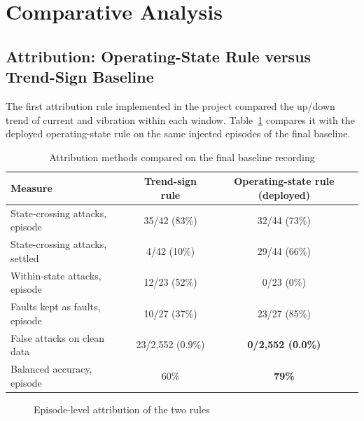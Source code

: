 \section{Comparative Analysis}

\subsection{Attribution: Operating-State Rule versus Trend-Sign Baseline}

The first attribution rule implemented in the project compared the up/down trend of current and vibration within each window. Table~\ref{tab:attribcompare} compares it with the deployed operating-state rule on the same injected episodes of the final baseline.

\begin{table}[htbp]
\centering
\caption{Attribution methods compared on the final baseline recording}
\label{tab:attribcompare}
\small
\begin{tabularx}{\textwidth}{@{}X c c@{}}
\toprule
\textbf{Measure} & \textbf{Trend-sign rule} & \textbf{Operating-state rule (deployed)} \\
\midrule
State-crossing attacks, episode & 35/42 (83\%) & 32/44 (73\%) \\
State-crossing attacks, settled & 4/42 (10\%) & 29/44 (66\%) \\
Within-state attacks, episode & 12/23 (52\%) & 0/23 (0\%) \\
Faults kept as faults, episode & 10/27 (37\%) & 23/27 (85\%) \\
False attacks on clean data & 23/2,552 (0.9\%) & \textbf{0/2,552 (0.0\%)} \\
Balanced accuracy, episode & 60\% & \textbf{79\%} \\
\bottomrule
\end{tabularx}
\end{table}

\begin{figure}[htbp]
\centering
{}
\caption{Episode-level attribution of the two rules}
\label{fig:attribcompare}
\end{figure}

